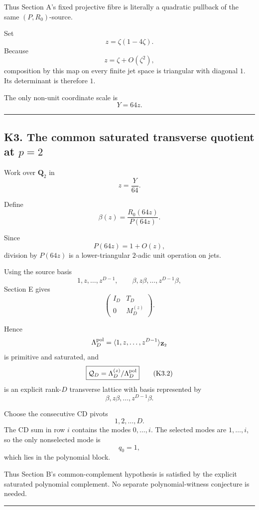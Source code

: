 \documentclass[
  10pt,
  letterpaper,
]{article}
\theoremstyle{definition}
\theoremstyle{remark}
\begin{document}
Thus Section A's fixed projective fibre is literally a quadratic
pullback of the same \((P,R_0)\)-source.

Set \[
z=\zeta(1-4\zeta).
\] Because \[
z=\zeta+O(\zeta^2),
\] composition by this map on every finite jet space is triangular with
diagonal \(1\). Its determinant is therefore \(1\).

The only non-unit coordinate scale is \[
Y=64z.
\]

\begin{center}\rule{0.5\linewidth}{0.5pt}\end{center}

\subsection{\texorpdfstring{K3. The common saturated transverse quotient
at
\(p=2\)}{K3. The common saturated transverse quotient at p=2}}\label{k3.-the-common-saturated-transverse-quotient-at-p2}

Work over \(\mathbf Q_2\) in \[
z=\frac Y{64}.
\]

Define \[
\beta(z)=\frac{R_0(64z)}{P(64z)}.
\]

Since \[
P(64z)=1+O(z),
\] division by \(P(64z)\) is a lower-triangular \(2\)-adic unit
operation on jets.

Using the source basis \[
1,z,\ldots,z^{D-1},
\qquad
\beta,z\beta,\ldots,z^{D-1}\beta,
\] Section E gives \[
\begin{pmatrix}
I_D&T_D\\
0&M_D^{(z)}
\end{pmatrix}.
\tag{K3.1}
\]

Hence \[
\Lambda_D^{\rm pol}
=
\langle1,z,\ldots,z^{D-1}\rangle_{\mathbf Z_2}
\] is primitive and saturated, and \[
\boxed{
\mathcal Q_D
=
\Lambda_D^{(z)}/\Lambda_D^{\rm pol}
}
\tag{K3.2}
\] is an explicit rank-\(D\) transverse lattice with basis represented
by \[
\beta,z\beta,\ldots,z^{D-1}\beta.
\]

Choose the consecutive CD pivots \[
1,2,\ldots,D.
\] The CD sum in row \(i\) contains the modes \(0,\ldots,i\). The
selected modes are \(1,\ldots,i\), so the only nonselected mode is \[
q_0=1,
\] which lies in the polynomial block.

Thus Section B's common-complement hypothesis is satisfied by the
explicit saturated polynomial complement. No separate polynomial-witness
conjecture is needed.

\begin{center}\rule{0.5\linewidth}{0.5pt}\end{center}
\end{document}
